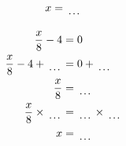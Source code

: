 \documentclass[12pt]{article}
\newcounter{minipagecount}
\begin{document}
\begin{multicols}{2}
\begin{minipage}[t]{0.45\textwidth}
\begin{align*}
        x &= \dotuline{\hspace{5mm}}\\
    \end{align*}
\end{minipage} %
\noindent{(\theminipagecount)}\hspace{0.1mm} %
\begin{minipage}[t]{0.45\textwidth} %
    \vspace{-26pt}  %
    \raggedright %
    \begin{align*} %
        \frac{x}{8} - 4 &= 0\\
        \frac{x}{8} - 4 + \dotuline{\hspace{5mm}} &= 0 + \dotuline{\hspace{5mm}}\\
        \frac{x}{8} &= \dotuline{\hspace{5mm}}\\
        \frac{x}{8} \times\dotuline{\hspace{5mm}} &= \dotuline{\hspace{5mm}} \times\dotuline{\hspace{5mm}}\\
        x &= \dotuline{\hspace{5mm}}\\
    \end{align*}
\end{minipage} %
\noindent{(\theminipagecount)}\hspace{0.1mm} %
\begin{minipage}[t]{0.45\textwidth} %
    \vspace{-26pt}  %

\end{minipage}
\end{multicols}
\end{document}

